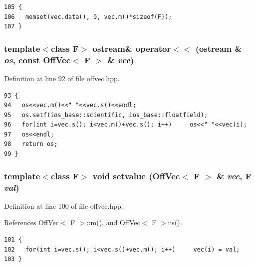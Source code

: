 \footnotesize\begin{verbatim}105 {
106   memset(vec.data(), 0, vec.m()*sizeof(F));
107 }
\end{verbatim}\normalsize 


\subsubsection{\setlength{\rightskip}{0pt plus 5cm}template$<$class F$>$ ostream\& operator$<$$<$ (ostream \& {\em os}, const {\bf Off\-Vec}$<$ F $>$ \& {\em vec})\hspace{0.3cm}{\tt  [inline]}}\label{offvec_8hpp_e9480f2d94438f27d051cbeb8f2a13a1_e9480f2d94438f27d051cbeb8f2a13a1}




Definition at line 92 of file offvec.hpp.

\footnotesize\begin{verbatim}93 {
94   os<<vec.m()<<" "<<vec.s()<<endl;
95   os.setf(ios_base::scientific, ios_base::floatfield);
96   for(int i=vec.s(); i<vec.m()+vec.s(); i++)     os<<" "<<vec(i);
97   os<<endl;
98   return os;
99 }
\end{verbatim}\normalsize 


\subsubsection{\setlength{\rightskip}{0pt plus 5cm}template$<$class F$>$ void setvalue ({\bf Off\-Vec}$<$ F $>$ \& {\em vec}, F {\em val})\hspace{0.3cm}{\tt  [inline]}}\label{offvec_8hpp_e64b94fde80aeb23f15b9b709d8bf3c4_e64b94fde80aeb23f15b9b709d8bf3c4}




Definition at line 100 of file offvec.hpp.

References Off\-Vec$<$ F $>$::m(), and Off\-Vec$<$ F $>$::s().

\footnotesize\begin{verbatim}101 {
102   for(int i=vec.s(); i<vec.s()+vec.m(); i++)     vec(i) = val;
103 }
\end{verbatim}\normalsize 


